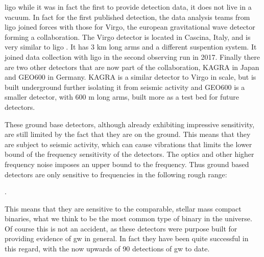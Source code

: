 \documentclass[
  10pt,
  a4paper,
  DIV=11,
  numbers=noendperiod,
  oneside]{scrreprt}
\let\[\relax \let\]\relax %
\DeclareRobustCommand{\[}{\begin{equation}}
\DeclareRobustCommand{\]}{\end{equation}}
\begin{document}
\gls{ligo} while it was in fact the first to provide detection data, it
does not live in a vacuum. In fact for the first published detection,
the data analysis teams from \gls{ligo} joined forces with those for
Virgo, the european gravitational wave detector forming a collaboration.
The Virgo detector is located in Cascina, Italy, and is very similar to
\gls{ligo} . It has \(3\text{ km}\) long arms and a different suspention
system. It joined data collection with \gls{ligo} in the second
observing run in 2017. Finally there are two other detectors that are
now part of the collaboration, KAGRA in Japan and GEO600 in Germany.
KAGRA is a similar detector to Virgo in scale, but is built underground
further isolating it from seismic activity and GEO600 is a smaller
detector, with \(600 \text{ m}\) long arms, built more as a test bed for
future detectors.

These ground base detectors, although already exhibiting impressive
sensitivity, are still limited by the fact that they are on the ground.
This means that they are subject to seismic activity, which can cause
vibrations that limits the lower bound of the frequency sensitivity of
the detectors. The optics and other higher frequency noise imposes an
upper bound to the frequency. Thus ground based detectors are only
sensitive to frequencies in the following rough range:

\[
.
\]

This means that they are sensitive to the comparable, stellar mass
 compact
binaries, what we think to be the most common type of binary in the
universe. Of course this is not an accident, as these detectors were
purpose built for providing evidence of \gls{gw} in general. In fact
they have been quite successful in this regard, with the now upwards of
90 detections of \gls{gw} to date.
\end{document}
